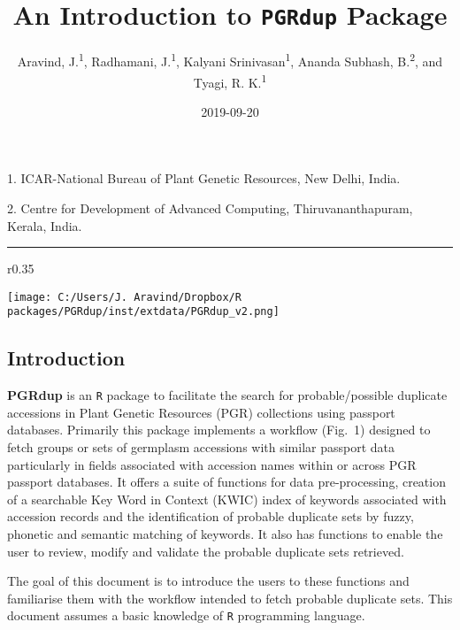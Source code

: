 \documentclass[]{article}
\title{An Introduction to \texttt{PGRdup} Package}
\author{Aravind, J.\textsuperscript{1}, Radhamani, J.\textsuperscript{1},
Kalyani Srinivasan\textsuperscript{1}, Ananda Subhash,
B.\textsuperscript{2}, and Tyagi, R. K.\textsuperscript{1}}
\date{2019-09-20}
\begin{document}
\maketitle

{
\setcounter{tocdepth}{3}
\tableofcontents
}
\begin{center}
1. ICAR-National Bureau of Plant Genetic Resources, New Delhi, India.

2. Centre for Development of Advanced Computing, Thiruvananthapuram, Kerala, India.

\end{center}

\begin{center}
\vspace{6pt}
\hrule
\end{center}

\tableofcontents

\begin{wrapfigure}{r}{0.35\textwidth}
  \vspace{1cm}
  \begin{center}
    \texttt{[image: C:/Users/J. Aravind/Dropbox/R packages/PGRdup/inst/extdata/PGRdup\_v2.png]}
  \end{center}
  \vspace{-1.5cm}
\end{wrapfigure}\leavevmode

\hypertarget{introduction}{%
\subsection{Introduction }\label{introduction}}

\textbf{PGRdup} is an \texttt{R} package to facilitate the search for
probable/possible duplicate accessions in Plant Genetic Resources (PGR)
collections using passport databases. Primarily this package implements
a workflow (Fig.~1) designed to fetch groups or sets of germplasm
accessions with similar passport data particularly in fields associated
with accession names within or across PGR passport databases. It offers
a suite of functions for data pre-processing, creation of a searchable
Key Word in Context (KWIC) index of keywords associated with accession
records and the identification of probable duplicate sets by fuzzy,
phonetic and semantic matching of keywords. It also has functions to
enable the user to review, modify and validate the probable duplicate
sets retrieved.

The goal of this document is to introduce the users to these functions
and familiarise them with the workflow intended to fetch probable
duplicate sets. This document assumes a basic knowledge of \texttt{R}
programming language.
\end{document}
